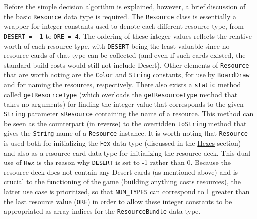 \documentclass[pageno]{jpaper}
\begin{document}
\begin{doublespacing}
Before the simple decision algorithm is explained, however, a brief discussion of the basic \lstinline$Resource$ data type is required. The \lstinline$Resource$ class is essentially a wrapper for integer constants used to denote each different resource type, from \lstinline$DESERT = -1$ to \lstinline$ORE = 4$. The ordering of these integer values reflects the relative worth of each resource type, with \lstinline$DESERT$ being the least valuable since no resource cards of that type can be collected (and even if such cards existed, the standard build costs would still not include Desert). Other elements of \lstinline$Resource$ that are worth noting are the \lstinline$Color$ and \lstinline$String$ constants, for use by \lstinline$BoardDraw$ and for naming the resources, respectively. There also exists a \lstinline$static$ method called \lstinline$getResourceType$ (which overloads the \lstinline$getResourceType$ method that takes no arguments) for finding the integer value that corresponds to the given \lstinline$String$ parameter \lstinline$sResource$ containing the name of a resource. This method can be seen as the counterpart (in reverse) to the overridden \lstinline$toString$ method that gives the \lstinline$String$ name of a \lstinline$Resource$ instance. It is worth noting that \lstinline$Resource$ is used both for initializing the \lstinline$Hex$ data type (discussed in the \hyperlink{sec:hexes}{Hexes} section) and also as a resource card data type for initializing the resource deck. This dual use of \lstinline$Hex$ is the reason why \lstinline$DESERT$ is set to -1 rather than 0. Because the resource deck does not contain any Desert cards (as mentioned above) and is crucial to the functioning of the game (building anything costs resources), the latter use case is prioritized, so that \lstinline$NUM_TYPES$ can correspond to 1 greater than the last resource value (\lstinline$ORE$) in order to allow these integer constants to be appropriated as array indices for the \lstinline$ResourceBundle$ data type.


\end{doublespacing}
\end{document}
